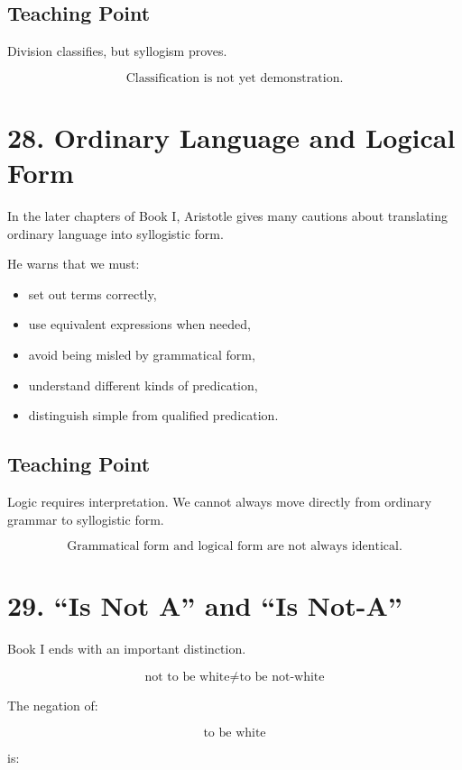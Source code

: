 \documentclass[12pt]{article}
\begin{document}
\subsection*{Teaching Point}

Division classifies, but syllogism proves.

\[
\boxed{
\text{Classification is not yet demonstration.}
}
\]

\section*{28. Ordinary Language and Logical Form}

In the later chapters of Book I, Aristotle gives many cautions about translating
ordinary language into syllogistic form.

He warns that we must:

\begin{itemize}[itemsep=0.25em]
    \item set out terms correctly,
    \item use equivalent expressions when needed,
    \item avoid being misled by grammatical form,
    \item understand different kinds of predication,
    \item distinguish simple from qualified predication.
\end{itemize}

\subsection*{Teaching Point}

Logic requires interpretation. We cannot always move directly from ordinary
grammar to syllogistic form.

\[
\boxed{
\text{Grammatical form and logical form are not always identical.}
}
\]

\section*{29. ``Is Not A'' and ``Is Not-A''}

Book I ends with an important distinction.

\[
\text{not to be white}
\neq
\text{to be not-white}
\]

The negation of:

\[
\text{to be white}
\]

is:
\end{document}
